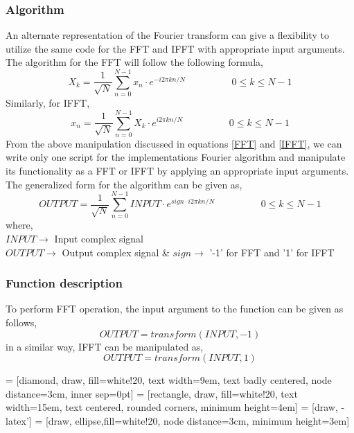 \subsubsection{Algorithm}
An alternate representation of the Fourier transform can give a flexibility to utilize the same code for the FFT and IFFT with appropriate input arguments. The algorithm for the FFT will follow the following formula,
\begin{equation}
X_k =\frac{1}{\sqrt{N}} \sum\limits_{n=0}^{N-1} x_n \cdot e^{-i2\pi kn/N}		\hspace{2cm}	0\leq k \leq N-1 
\label{FFT}
\end{equation}
Similarly, for IFFT,
\begin{equation}
x_n =\frac{1}{\sqrt{N}} \sum\limits_{n=0}^{N-1} X_k \cdot e^{i2\pi kn/N}		\hspace{2cm}	0\leq k \leq N-1 
\label{IFFT}
\end{equation}
From the above manipulation discussed in equations \ref{FFT} and \ref{IFFT}, we can write only one script for the implementations Fourier algorithm and manipulate its functionality as a FFT or IFFT by applying an appropriate input arguments. \\
The generalized form for the algorithm can be given as,
\begin{equation}
OUTPUT =\frac{1}{\sqrt{N}} \sum\limits_{n=0}^{N-1} INPUT \cdot e^{sign \cdot i2\pi kn/N}		\hspace{2cm}	0\leq k \leq N-1 
\label{FT}
\end{equation}
where,\\
$INPUT \rightarrow$ {Input complex signal}\\
$OUTPUT \rightarrow$ {Output complex signal} \& $sign \rightarrow$ {'-1' for FFT and '1' for IFFT}\\

\subsubsection{Function description}
To perform FFT operation, the input argument to the function can be given as follows,
\begin{equation*}
OUTPUT = transform(INPUT,-1)
\end{equation*}
in a similar way, IFFT can be manipulated as,
\begin{equation*}
OUTPUT = transform(INPUT,1)
\end{equation*}

\newpage
 = [diamond, draw, fill=white!20, 
text width=9em, text badly centered, node distance=3cm, inner sep=0pt]
 = [rectangle, draw, fill=white!20, 
text width=15em, text centered, rounded corners, minimum height=4em]
 = [draw, -latex']
 = [draw, ellipse,fill=white!20, node distance=3cm,
minimum height=3em]

